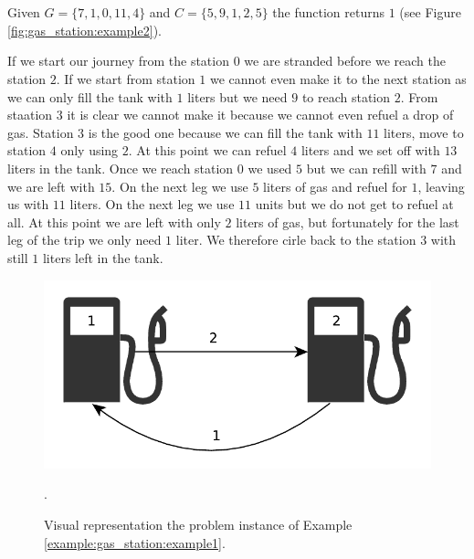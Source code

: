 \begin{exercise}
	\begin{example}
		\label{example:gas_station:example2}
		\hfill \\
		
		\hfill \\
		Given $G=\{7,1,0,11,4\}$ and $C=\{5,9,1,2,5\}$ the function returns $1$ (see Figure \ref{fig:gas_station:example2}).

		If we start our journey from the station $0$ we are stranded before we reach the station $2$. 
		If we start from station $1$ we cannot even make it to the next station as we can only fill the tank with $1$ liters but we need $9$ to reach station $2$. From staation $3$ it is clear we cannot make it because we cannot even refuel a drop of gas. 
		Station $3$ is the good one because we can fill the tank with $11$ liters, move to station $4$ only using $2$. At this point we can refuel $4$ liters and we set off with $13$ liters in the tank. Once we reach station $0$ we used $5$ but we can refill with $7$ and we are left with $15$.
		On the next leg we use $5$ liters of gas and refuel for $1$, leaving us with $11$ liters. On the next leg we use $11$ units but we do not get to refuel at all. At this point we are left with only $2$ liters of gas, but fortunately for the last leg of the trip we only need $1$ liter. 
		We therefore cirle back to the station $3$ with still $1$ liters left in the tank.

	\end{example}

\end{exercise}


\begin{figure}
	\centering
	\includegraphics[width=\textwidth]{sources/gas_station/images/example1}
	\caption[Implicit graph for the Example \ref{example:gas_station:example1}.]
	{Visual representation the problem instance of Example
	\ref{example:gas_station:example1}.}.
	\label{fig:gas_station:example1}
\end{figure}

